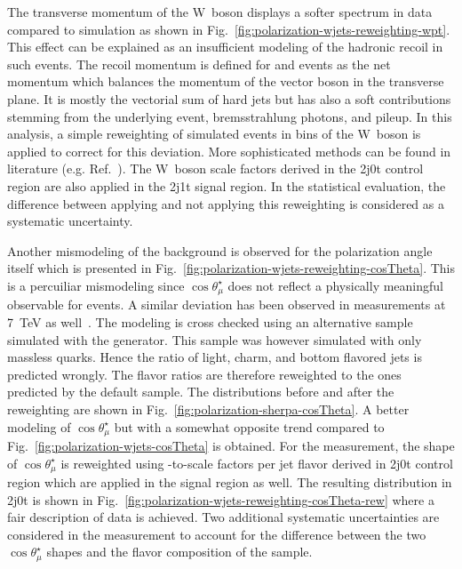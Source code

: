 The transverse momentum of the W~boson displays a softer spectrum in data compared to simulation as shown in Fig.~\ref{fig:polarization-wjets-reweighting-wpt}. This effect can be explained as an insufficient modeling of the hadronic recoil in such events. The recoil momentum is defined for \zjets and \wjets events as the net momentum which balances the momentum of the vector boson in the transverse plane. It is mostly the vectorial sum of hard jets but has also a soft contributions stemming from the underlying event, bremsstrahlung photons, and pileup. In this analysis, a simple reweighting of simulated events in bins of the W~boson \pt is applied to correct for this deviation. More sophisticated methods can be found in literature (e.g. Ref.~\cite{Abazov:2009tra}). The W~boson \pt scale factors derived in the 2j0t control region are also applied in the 2j1t signal region. In the statistical evaluation, the difference between applying and not applying this reweighting is considered as a systematic uncertainty.


Another mismodeling of the \wjets background is observed for the polarization angle itself which is presented in Fig.~\ref{fig:polarization-wjets-reweighting-cosTheta}. This is a percuiliar mismodeling since $\cos\theta_\mu^\star$ does not reflect a physically meaningful observable for \wjets events. A similar deviation has been observed in measurements at 7~TeV as well~\cite{Komm-thesis}. The modeling is cross checked using an alternative \wjets sample simulated with the \SHERPA generator. This sample was however simulated with only massless quarks. Hence the ratio of light, charm, and bottom flavored jets is predicted wrongly. The flavor ratios are therefore reweighted to the ones predicted by the default \MG sample. The distributions before and after the reweighting are shown in Fig.~\ref{fig:polarization-sherpa-cosTheta}. A better modeling of $\cos\theta_{\mu}^\star$ but with a somewhat opposite trend compared to Fig.~\ref{fig:polarization-wjets-cosTheta} is obtained. For the measurement, the shape of $\cos\theta_{\mu}^\star$ is reweighted using \MG-to-\SHERPA scale factors per jet flavor derived in 2j0t control region which are applied in the signal region as well. The resulting distribution in 2j0t is shown in Fig.~\ref{fig:polarization-wjets-reweighting-cosTheta-rew} where a fair description of data is achieved. Two additional systematic uncertainties are considered in the measurement to account for the difference between the two $\cos\theta_\mu^\star$ shapes and the flavor composition of the \wjets sample.

